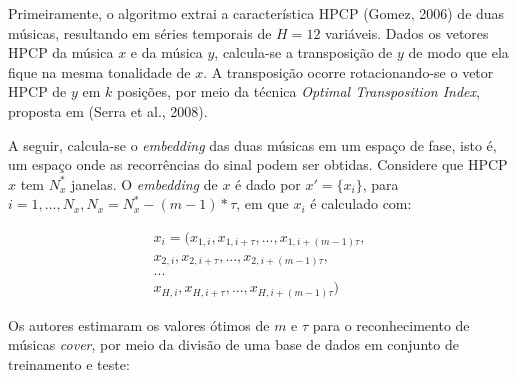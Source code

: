 Primeiramente, o algoritmo extrai a característica HPCP (Gomez, 2006) de duas músicas, resultando em séries temporais de \({H = 12}\) variáveis. Dados os vetores HPCP da música \textbf{\({x}\)} e da música \textbf{\({y}\)}, calcula-se a transposição de \textbf{\({y}\)} de modo que ela fique na mesma tonalidade de \textbf{\({x}\)}. A transposição ocorre rotacionando-se o vetor HPCP de \textbf{\({y}\)} em \({k}\) posições, por meio da técnica \textit{Optimal Transposition Index}, proposta em (Serra et al., 2008).

A seguir, calcula-se o \textit{embedding} das duas músicas em um espaço de fase, isto é, um espaço onde as recorrências do sinal podem ser obtidas. Considere que  HPCP \textbf{\({x}\)} tem \({N_{x}^{*}}\) janelas. O \textit{embedding} de \textbf{\({x}\)} é dado por \({x' = \big\{x_{i}\big\}}\), para \({i = 1, ..., N_{x}, N_{x} = N_{x}^{*} - (m - 1)*\tau}\), em que \({x_{i}}\) é calculado com:

\begin{gather}
    x_{i} = (x_{1,i},x_{1,i+\tau}, ..., x_{1,i+(m-1)\tau},\\
             x_{2,i},x_{2,i+\tau}, ..., x_{2,i+(m-1)\tau},\\
                                                   ...\\
             x_{H,i},x_{H,i+\tau}, ..., x_{H,i+(m-1)\tau})
\end{gather}

Os autores estimaram os valores ótimos de \({m}\) e \({\tau}\) para o reconhecimento de músicas \textit{cover}, por meio da divisão de uma base de dados em conjunto de treinamento e teste: